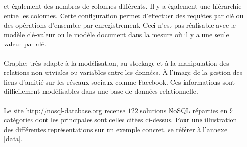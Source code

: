 et également des nombres de colonnes différents. Il y a également une
hiérarchie entre les colonnes. Cette configuration permet d’effectuer
des requêtes par clé ou des opérations d'ensemble par enregistrement.
Ceci n'est
pas réalisable avec le modèle \textsf{clé-valeur} ou le
modèle \textsf{document} dans la mesure où il y a une seule valeur par
clé.
\\
\\
{\sf Graphe}: très adapté à la
modélisation, au stockage et à la manipulation des relations
non-triviales ou variables entre les données. À l'image de la gestion
des liens d'amitié sur les réseaux sociaux comme \textsf{Facebook}. 
Ces informations sont difficilement
modélisables dans une base de données relationnelle.
\\
\\ 
Le site \url{http://nosql-database.org} recense $122$
solutions \textsf{NoSQL} réparties en $9$ catégories dont les
principales sont celles citées ci-dessus. Pour une
illustration des différentes représentations sur un exemple concret, 
se référer à l'annexe \ref{data}.
